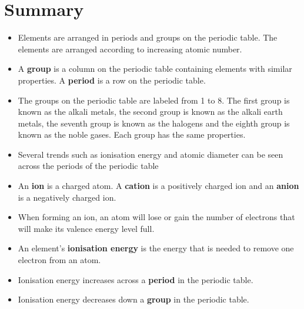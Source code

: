             \section{Summary}
            \nopagebreak
            \label{m38757*uid0123}\begin{itemize}[noitemsep]
            \label{m38757*id79342}\item Elements are arranged in periods and groups on the periodic table. The elements are arranged according to increasing atomic number. 
\label{m38757*id97342}\item A \textbf{group} is a column on the periodic table containing elements with similar properties. A \textbf{period} is a row on the periodic table.
\item The groups on the periodic table are labeled from 1 to 8. The first group is known as the alkali metals, the second group is known as the alkali earth metals, the seventh group is known as the halogens and the eighth group is known as the noble gases. Each group has the same properties.\item Several trends such as ionisation energy and atomic diameter can be seen across the periods of the periodic table\label{m38757*uid184}\item An \textbf{ion} is a charged atom. A \textbf{cation} is a positively charged ion and an \textbf{anion} is a negatively charged ion.
\label{m38757*uid185}\item When forming an ion, an atom will lose or gain the number of electrons that will make its valence energy level full.
\label{m38757*uid186}\item An element's \textbf{ionisation energy} is the energy that is needed to remove one electron from an atom.
\label{m38757*uid187}\item Ionisation energy increases across a \textbf{period} in the periodic table.
\label{m38757*uid188}\item Ionisation energy decreases down a \textbf{group} in the periodic table.
\end{itemize}
        \label{m38757*eip-219}
            



